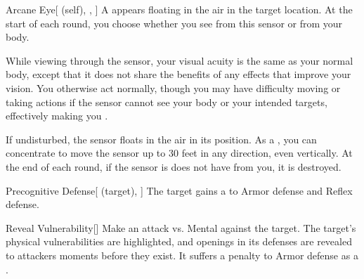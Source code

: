 \lowercase{\hypertarget{spell:Arcane Eye}{}}\label{spell:Arcane Eye}
\begin{attuneability}[\nth{1}]{\hypertarget{spell:Arcane Eye}{Arcane Eye}}[ (self), , ]
A  appears floating in the air in the target location.
At the start of each round, you choose whether you see from this sensor or from your body.

While viewing through the sensor, your visual acuity is the same as your normal body, except that it does not share the benefits of any  effects that improve your vision.
You otherwise act normally, though you may have difficulty moving or taking actions if the sensor cannot see your body or your intended targets, effectively making you \blinded.

If undisturbed, the sensor floats in the air in its position.
As a , you can concentrate to move the sensor up to 30 feet in any direction, even vertically.
At the end of each round, if the sensor is does not have  from you, it is destroyed.
\end{attuneability}
\vspace{0.25em}



\lowercase{\hypertarget{spell:Precognitive Defense}{}}\label{spell:Precognitive Defense}
\begin{attuneability}[\nth{1}]{\hypertarget{spell:Precognitive Defense}{Precognitive Defense}}[ (target), ]
The target gains a   to Armor defense and Reflex defense.
\end{attuneability}
\vspace{0.25em}



\lowercase{\hypertarget{spell:Reveal Vulnerability}{}}\label{spell:Reveal Vulnerability}
\begin{freeability}[\nth{1}]{\hypertarget{spell:Reveal Vulnerability}{Reveal Vulnerability}}[]
Make an attack vs. Mental against the target.
\hit The target's physical vulnerabilities are highlighted, and openings in its defenses are revealed to attackers moments before they exist.
It suffers a  penalty to Armor defense as a .
\end{freeability}
\vspace{0.25em}



